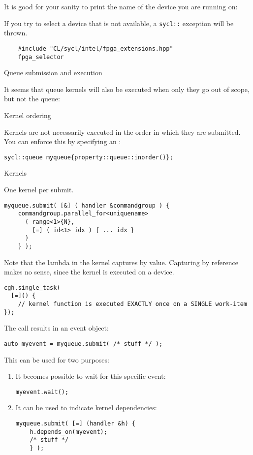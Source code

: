 It is good for your sanity to print the name of the device
you are running on:

If you try to select a device that is not available,
a \lstinline+sycl::+ exception will be thrown.

\begin{dpcppnote}
  \begin{lstlisting}
    #include "CL/sycl/intel/fpga_extensions.hpp"
    fpga_selector
  \end{lstlisting}
\end{dpcppnote}

 {Queue submission and execution}

It seems that queue kernels will also be executed when only they
go out of scope, but not the queue:
%

 {Kernel ordering}

Kernels are not necessarily executed in the order in which they are submitted.
You can enforce this by specifying an :
\begin{lstlisting}
sycl::queue myqueue{property::queue::inorder()};
\end{lstlisting}

 {Kernels}

One kernel per submit.

\begin{lstlisting}
myqueue.submit( [&] ( handler &commandgroup ) {
    commandgroup.parallel_for<uniquename> 
      ( range<1>{N},
        [=] ( id<1> idx ) { ... idx }
      )
    } );
\end{lstlisting}

Note that the lambda in the kernel captures by value.
Capturing by reference makes no sense,
since the kernel is executed on a device.

\begin{lstlisting}
cgh.single_task(
  [=]() {
    // kernel function is executed EXACTLY once on a SINGLE work-item
});
\end{lstlisting}

The  call results in an event object:
\begin{lstlisting}
auto myevent = myqueue.submit( /* stuff */ );
\end{lstlisting}
This can be used for two purposes:
\begin{enumerate}
\item It becomes possible to wait for this specific event:
\begin{lstlisting}
myevent.wait();    
\end{lstlisting}
\item It can be used to indicate kernel dependencies:
\begin{lstlisting}
myqueue.submit( [=] (handler &h) {
    h.depends_on(myevent);
    /* stuff */
    } );
\end{lstlisting}
\end{enumerate}

